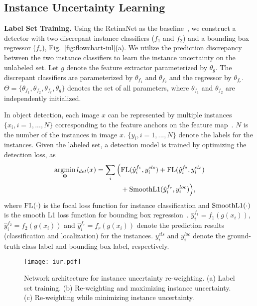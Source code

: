 \documentclass[final]{cvpr}
\DeclareMathOperator*{\argmin}{argmin}
\begin{document}
\subsection{Instance Uncertainty Learning}

\textbf{Label Set Training.} Using the RetinaNet as the baseline~\cite{RetinaNet20}, we construct a detector with two discrepant instance classifiers (${f_1}$ and ${f_2}$) and a bounding box regressor ($f_r$), Fig.~\ref{fig:flowchart-iul}(a). We utilize the prediction discrepancy between the two instance classifiers to learn the instance uncertainty on the unlabeled set. Let $g$ denote the feature extractor parameterized by $\theta_g$. The discrepant classifiers are parameterized by $\theta_{f_1}$ and $\theta_{f_2}$ and the regressor by $\theta_{f_r}$. $\Theta = \{\theta_{f_1}, \theta_{f_2}, \theta_{f_r}, \theta_{g}\}$ denotes the set of all parameters, where $\theta_{f_1}$ and $\theta_{f_2}$ are independently initialized.

In object detection, each image $x$ can be represented by multiple instances $ \{x_i, i=1,...,N\}$ corresponding to the feature anchors on the feature map~\cite{RetinaNet20}. $N$ is the number of the instances in image $x$. $\{y_{i}, i=1,...,N\}$ denote the labels for the instances. Given the labeled set, a detection model is trained by optimizing the detection loss, as
\begin{equation}
    \label{eq_detection}
    \begin{split}
        \argmin_{\Theta} {l}_{det}(x) =
        \sum_i \Big( & {\rm FL}(\hat{y}_i^{f_1}, {{y}_i^{cls}})
         + {\rm FL}(\hat{y}_i^{f_2},{y}_i^{cls})\\ 
         &+ {\rm SmoothL1}(\hat{y}_i^{f_r}, {y}_i^{loc})\Big),
    \end{split}
\end{equation}
where ${\rm FL}(\cdot)$ is the focal loss function for instance classification and ${\rm SmoothL1}(\cdot)$ is the smooth L1 loss function for bounding box regression~\cite{RetinaNet20}. $\hat{y}_i^{f_1} = f_1(g({x}_i))$, $\hat{y}_i^{f_2} = f_2(g({x}_i))$ and $\hat{y}_{i}^{f_r} = f_r(g(x_i))$ denote the prediction results (classification and localization) for the instances. ${y}_i^{cls}$ and ${y}_i^{loc}$ denote the ground-truth class label and bounding box label, respectively. 

\begin{figure*}[t]
    \centering
    \texttt{[image: iur.pdf]}
    \caption{Network architecture for instance uncertainty re-weighting. (a) Label set training. (b) Re-weighting and maximizing instance uncertainty. (c) Re-weighting while minimizing instance uncertainty.}
    \label{fig:flowchart-iur}
\end{figure*}
\end{document}
